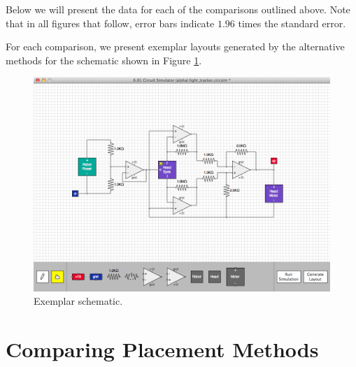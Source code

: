 Below we will present the data for each of the comparisons outlined above. Note
that in all figures that follow, error bars indicate $1.96$ times the
standard error.

For each comparison, we present exemplar layouts generated by the alternative
methods for the schematic shown in Figure \ref{fig:exemplar_schematic}.

\begin{figure}
\begin{center}
\includegraphics[width=\textwidth]{Images/exemplar_schematic.png}
\caption{Exemplar schematic.}
\label{fig:exemplar_schematic}
\end{center}
\end{figure}

\section{Comparing Placement Methods}
\label{sec:compare_placement}

